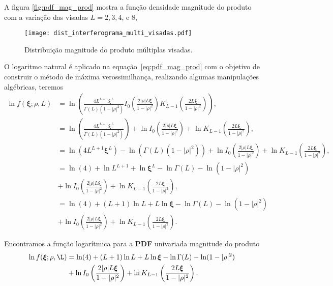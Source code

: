 A figura \eqref{fig:pdf_mag_prod} mostra a função densidade magnitude do produto com a variação das visadas $L=2,3,4$, e $8$, 
\begin{figure}[hbt]
\centering
\texttt{[image: dist\_interferograma\_multi\_visadas.pdf]}
	\caption{Distribuição magnitude do produto múltiplas visadas.}
\label{fig:pdf_mag_prod}
\end{figure}


O logaritmo natural é aplicado na equação~\eqref{eq:pdf_mag_prod} com o objetivo de construir o método de máxima verossimilhança, realizando algumas manipulações algébricas, teremos
\begin{equation}\nonumber
\begin{split}
	\ln f(\bm\xi;\rho,L)&=\ln\left(\frac{4L^{L+1}\bm\xi^L}{\Gamma(L)(1-|\rho|^2)}I_0\left(\frac{2|\rho|L\bm\xi}{1-|\rho|^2}\right)K_{L-1}\left(\frac{2L\bm\xi}{1-|\rho|^2}\right)\right),\\
	&=\ln\left(\frac{4L^{L+1}\bm\xi^L}{\Gamma(L)(1-|\rho|^2)}\right)+\ln I_0\left(\frac{2|\rho|L\bm\xi}{1-|\rho|^2}\right)+ \ln K_{L-1}\left(\frac{2L\bm\xi}{1-|\rho|^2}\right),\\
	&=\ln (4L^{L+1}\bm\xi^L)-\ln(\Gamma(L)(1-|\rho|^2))+\ln I_0\left(\frac{2|\rho|L\bm\xi}{1-|\rho|^2}\right)+ \ln K_{L-1}\left(\frac{2L\bm\xi}{1-|\rho|^2}\right),\\
     &=\ln (4)+\ln L^{L+1}+\ln \bm\xi^L-\ln\Gamma(L)-\ln(1-|\rho|^2)\\
     &+\ln I_0\left(\frac{2|\rho|L\bm\xi}{1-|\rho|^2}\right)+ \ln K_{L-1}\left(\frac{2L\bm\xi}{1-|\rho|^2}\right),\\
	&=\ln (4)+(L+1)\ln L+L\ln \bm\xi-\ln\Gamma(L)-\ln(1-|\rho|^2)\\
	&+\ln I_0\left(\frac{2|\rho|L\bm\xi}{1-|\rho|^2}\right)+ \ln K_{L-1}\left(\frac{2L\bm\xi}{1-|\rho|^2}\right).
		\end{split}
\end{equation}

Encontramos a função logarítmica para a \textbf{PDF} univariada magnitude do produto
\begin{equation}\label{eq:log_vero_mag_produto}
\begin{split}
	\ln f(\bm\xi; \rho,\L)&=\ln (4)+(L+1)\ln L+L\ln \bm\xi-\ln\Gamma(L)-\ln(1-|\rho|^2)\\
	                      &+\ln I_0\left(\frac{2|\rho|L\bm\xi}{1-|\rho|^2}\right)+ \ln K_{L-1}\left(\frac{2L\bm\xi}{1-|\rho|^2}\right).
	\end{split}
\end{equation}

